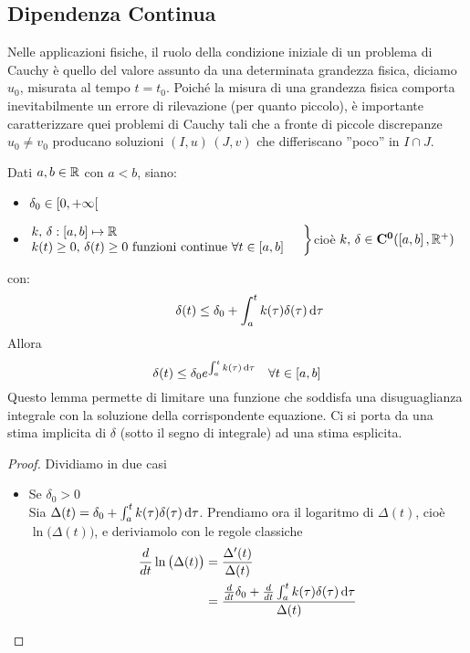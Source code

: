 \subsection{Dipendenza Continua}
Nelle applicazioni fisiche, il ruolo della condizione iniziale di un problema di Cauchy è quello del valore assunto da una determinata grandezza fisica, diciamo $u_0$, misurata al tempo $t=t_0$. Poiché la misura di una grandezza fisica comporta inevitabilmente un errore di rilevazione (per quanto piccolo), è importante caratterizzare quei problemi di Cauchy tali che a fronte di piccole discrepanze $u_0 \neq v_0$ producano soluzioni $(I,u)\,(J,v)$ che differiscano ”poco” in $I\cap J$.
\begin{lemma}
	\label{lemma:gronwall}
	Dati $a,b\in \mathbb{R}$ con $a < b$, siano:
	\begin{itemize}
		\item $\delta_0\in \left[0,+\infty\right[$
		\item $\hspace{-0.5em}\left.\begin{array}{ll}
				k,\,\delta:\left[a,b\right]\mapsto \mathbb{R} \\
				k(t)\geq 0,\,\delta(t) \geq 0 \text{ funzioni continue } \forall t \in \left[a,b\right]
		\end{array} \quad\right\}$\quad cioè \quad$k,\,\delta\in\mathbf{C^{0}}(\left[a,b\right],\mathbb{R}^{+})$
	\end{itemize}
	con:
	$$\qquad \delta(t)\le \delta_0+\int_{a}^{t}k(\tau)\delta(\tau)\,\mathrm{d}{\tau}$$
	Allora
	$$\delta(t)\le\delta_0e^{\int_{a}^{t}k(\tau)\,\mathrm{d}{\tau}} \quad \forall t \in \left[a,b\right]$$
	Questo lemma permette di limitare una funzione che soddisfa una disuguaglianza integrale con la soluzione della corrispondente equazione. Ci si porta da una stima implicita di $\delta$ (sotto il segno di integrale) ad una stima esplicita.
	\begin{proof}
		Dividiamo in due casi
		\begin{itemize}
			\item Se $\delta_0>0$\\
				Sia $\Delta(t) = \delta_0+\int_{a}^{t}k(\tau)\delta(\tau)\,\mathrm{d}{\tau}$. Prendiamo ora il logaritmo di $\Delta(t)$, cioè $\ln{\bigl(\Delta(t)\bigr)}$, e deriviamolo con le regole classiche
				\begin{align*}
					\frac{d}{dt}\ln{\bigl(\Delta(t)\bigr)} &= \frac{\Delta'(t)}{\Delta(t)}\\
					&= \frac{\frac{d}{dt}\delta_0 + \frac{d}{dt}\int_{a}^{t}k(\tau)\delta(\tau)\integrald{\tau}}{\Delta(t)}

\end{align*}
\end{itemize}
\end{proof}
\end{lemma}

